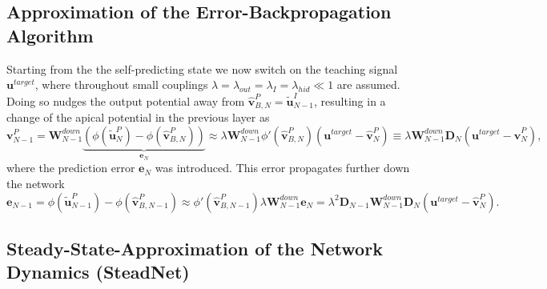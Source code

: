 \documentclass[12pt,a4paper]{article}
\begin{document}
\subsection{Approximation of the Error-Backpropagation Algorithm}
Starting from the the self-predicting state we now switch on the teaching signal $\bm{u}^{target}$, where throughout small couplings $\lambda = \lambda_{out} = \lambda_I = \lambda_{hid}\ll 1$ are assumed.\\
Doing so nudges the output potential away from $\hat{\bm{v}}^P_{B,N} = \tilde{\bm{u}}^I_{N-1}$, resulting in a change of the apical potential in the previous layer as
\begin{equation}
\bm{v}^P_{N-1} = \bm{W}^{down}_{N-1}\underbrace{\left(\phi(\tilde{\bm{u}}^P_N) - \phi(\hat{\bm{v}}^P_{B, N})\right)}_{\bm{e}_N} \approx \lambda\bm{W}^{down}_{N-1}\phi'(\hat{\bm{v}}^P_{B, N})\left(\bm{u}^{target} - \hat{\bm{v}}^P_{N}\right)\equiv \lambda\bm{W}^{down}_{N-1}\bm{D}_N\left(\bm{u}^{target} - \hat{\bm{v}}^P_{N}\right),
\end{equation}
where the prediction error $\bm{e}_N$ was introduced. This error propagates further down the network
\begin{equation}
\bm{e}_{N-1} = \phi(\tilde{\bm{u}}^P_{N-1}) - \phi(\hat{\bm{v}}^P_{B,N-1}) \approx \phi'(\hat{\bm{v}}^P_{B,N-1}) \lambda \bm{W}^{down}_{N-1}\bm{e}_N = \lambda^2 \bm{D}_{N-1}\bm{W}^{down}_{N-1}\bm{D}_N\left(\bm{u}^{target} - \hat{\bm{v}}^P_{N}\right).
\end{equation}

\subsection{Steady-State-Approximation of the Network Dynamics (SteadNet)}
\label{chap:steadnet}
\end{document}
